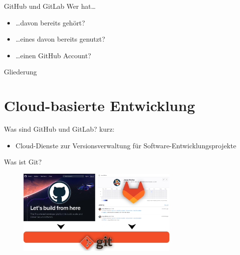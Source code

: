 \documentclass[compress,aspectratio=169]{beamer}
\begin{document}
	\begin{frame}[plain]
		\titlepage
	\end{frame}

	\begin{frame}{GitHub und GitLab}
		Wer hat\ldots
		\begin{itemize}
			\item \ldots davon bereits gehört?
			\item \ldots eines davon bereits genutzt?
			\item \ldots einen GitHub Account?
		\end{itemize}
	\end{frame}

	\begin{frame}[t]{Gliederung}
		\tableofcontents[subsectionstyle=hide/hide]
	\end{frame}


	\section{Cloud-basierte Entwicklung}
		
	\begin{frame}{Was sind GitHub und GitLab?}
		kurz:
		\begin{itemize}
			\item Cloud-Dienste zur Versionsverwaltung für Software-Entwicklungsprojekte
		\end{itemize}
	\end{frame}

	\begin{frame}{Was ist Git?}
		\begin{figure}
			\includegraphics[width=0.7\textwidth]{assets/git-base.png}
		\end{figure}
	\end{frame}
\end{document}
